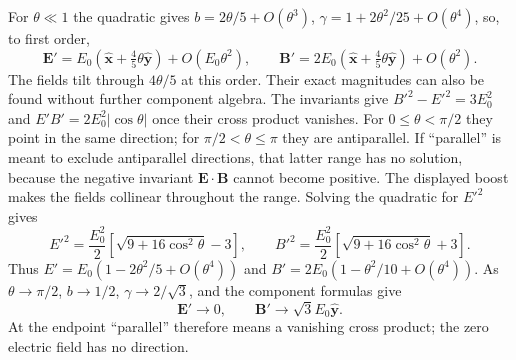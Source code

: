 For $\theta\ll1$ the quadratic gives $b=2\theta/5+O(\theta^3)$,
$\gamma=1+2\theta^2/25+O(\theta^4)$, so, to first order,
\[
\boxed{\mathbf E'=E_0(\hat{\mathbf x}+\tfrac45\theta\hat{\mathbf y})
+O(E_0\theta^2),\qquad
\mathbf B'=2E_0(\hat{\mathbf x}+\tfrac45\theta\hat{\mathbf y})
+O(\theta^2).}
\]
The fields tilt through $4\theta/5$ at this order. Their exact
magnitudes can also be found without further component algebra.
The invariants give $B'^2-E'^2=3E_0^2$ and
$E'B'=2E_0^2|\cos\theta|$ once their cross product vanishes.
For $0\leq\theta<\pi/2$ they point in the same direction;
for $\pi/2<\theta\leq\pi$ they are antiparallel. If ``parallel''
is meant to exclude antiparallel directions, that latter range
has no solution, because the negative invariant $\mathbf E\cdot\mathbf B$
cannot become positive. The displayed boost makes the fields
collinear throughout the range. Solving the quadratic for $E'^2$ gives
\[
E'^2=\frac{E_0^2}{2}[\sqrt{9+16\cos^2\theta}-3],\qquad
B'^2=\frac{E_0^2}{2}[\sqrt{9+16\cos^2\theta}+3].
\]
Thus $E'=E_0(1-2\theta^2/5+O(\theta^4))$ and
$B'=2E_0(1-\theta^2/10+O(\theta^4))$.
As $\theta\to\pi/2$, $b\to1/2$, $\gamma\to2/\sqrt3$, and the
component formulas give
\[
\boxed{\mathbf E'\to0,\qquad \mathbf B'\to\sqrt3E_0\hat{\mathbf y}.}
\]
At the endpoint ``parallel'' therefore means a vanishing cross
product; the zero electric field has no direction.

